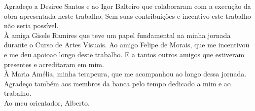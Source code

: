 \begin{agradecimento}

Agradeço a Desiree Santos e ao Igor Balteiro que colaboraram com a execução da obra apresentada neste trabalho. Sem suas contribuições e incentivo este trabalho não seria possível.\\

À amiga Gisele Ramires que teve um papel fundamental na minha jornada durante o Curso de Artes Visuais. Ao amigo Felipe de Morais, que me incentivou e me deu apoioao longo deste trabalho. E a tantos outros amigos que estiveram presentes e acreditaram em mim.\\


À Maria Amélia, minha terapeura, que me acompanhou ao longo dessa jornada.\\


Agradeço também aos membros da banca pelo tempo dedicado a mim e ao trabalho.\\


Ao meu orientador, Alberto.\\

\end{agradecimento}